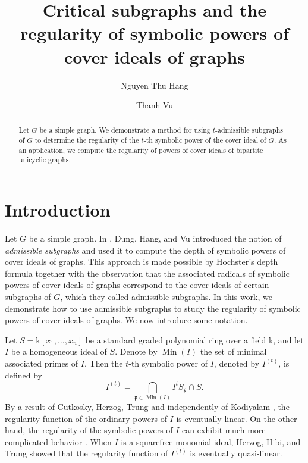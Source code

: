 \documentclass[12pt,amscd]{amsart}
\theoremstyle{definition}
\DeclareMathOperator{\Min}{Min}
\def\k {\mathrm k}
\begin{document}
\title[Regularity of symbolic powers of cover ideals]{Critical subgraphs and the regularity of symbolic powers of cover ideals of graphs}



\author[N.T. Hang]{Nguyen Thu Hang }
\address{Thai Nguyen University of Sciences, Phan Dinh phung Ward, Thai Nguyen, Vietnam}


\author{Thanh Vu}
\address{Institute of Mathematics, VAST, 18 Hoang Quoc Viet, Hanoi, Vietnam}



\begin{abstract} 
Let $G$ be a simple graph. We demonstrate a method for using $t$-admissible subgraphs of $G$ to determine the regularity of the $t$-th symbolic power of the cover ideal of $G$. As an application, we  compute the regularity of powers of cover ideals of bipartite unicyclic graphs.
\end{abstract}

\maketitle
\section{Introduction}
Let $G$ be a simple graph. In \cite{DHV}, Dung, Hang, and Vu introduced the notion of \emph{admissible subgraphs} and used it to compute the depth of symbolic powers of cover ideals of graphs. This approach is made possible by Hochster's depth formula \cite{H} together with the observation that the associated radicals of symbolic powers of cover ideals of graphs correspond to the cover ideals of certain subgraphs of $G$, which they called admissible subgraphs. In this work, we demonstrate how to use admissible subgraphs to study the regularity of symbolic powers of cover ideals of graphs. We now introduce some notation.

Let $S = \k[x_1, \ldots, x_n]$ be a standard graded polynomial ring over a field $\k$, and let $I$ be a homogeneous ideal of $S$. Denote by $\Min(I)$ the set of minimal associated primes of $I$. Then the $t$-th symbolic power of $I$, denoted by $I^{(t)}$, is defined by
\[
I^{(t)} = \bigcap_{\mathfrak{p} \in \Min(I)} I^t S_{\mathfrak{p}} \cap S.
\]
By a result of Cutkosky, Herzog, Trung \cite{CHT} and independently of Kodiyalam \cite{K}, the regularity function of the ordinary powers of $I$ is eventually linear. On the other hand, the regularity of the symbolic powers of $I$ can exhibit much more complicated behavior \cite{Cut}. When $I$ is a squarefree monomial ideal, Herzog, Hibi, and Trung \cite{HHT} showed that the regularity function of $I^{(t)}$ is eventually quasi-linear. 
\end{document}
